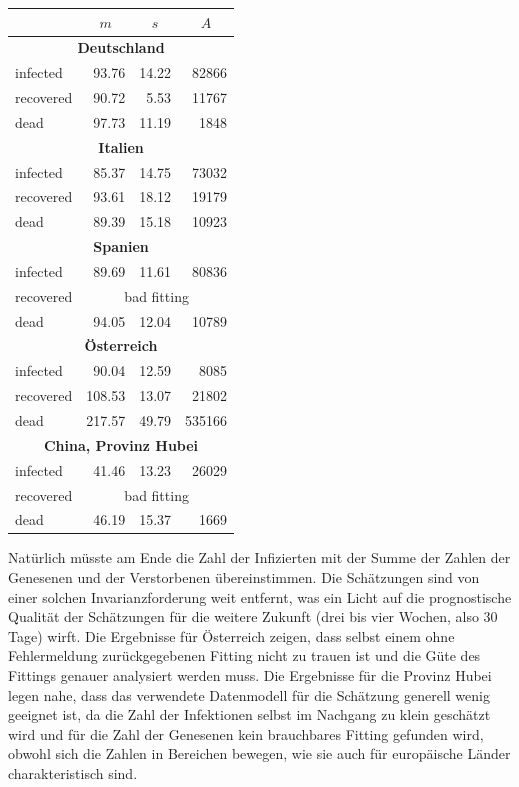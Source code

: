 \documentclass[a4paper,11pt]{article}
\begin{document}
\begin{center}
  \begin{tabular}{|l|r|r|r|}\hline
    & \multicolumn{1}{|c|}{$m$} & \multicolumn{1}{|c|}{$s$}
    & \multicolumn{1}{|c|}{$A$} \\\hline
    \multicolumn{4}{|c|}{\bf Deutschland}\\\hline
    infected   & 93.76 & 14.22 &  82866\\
    recovered  & 90.72 &  5.53 &  11767\\
    dead       & 97.73 & 11.19 &   1848\\\hline
    \multicolumn{4}{|c|}{\bf Italien}\\\hline
    infected   & 85.37 & 14.75 &  73032\\
    recovered  & 93.61 & 18.12 &  19179\\
    dead       & 89.39 & 15.18 &  10923\\\hline
    \multicolumn{4}{|c|}{\bf Spanien}\\\hline
    infected   & 89.69 & 11.61 &  80836\\
    recovered  & \multicolumn{3}{|c|}{bad fitting}\\
    dead       & 94.05 & 12.04 &  10789\\\hline
    \multicolumn{4}{|c|}{\bf Österreich}\\\hline
    infected   & 90.04 & 12.59 &   8085\\
    recovered  & 108.53& 13.07 &  21802\\
    dead       & 217.57& 49.79 & 535166\\\hline
    \multicolumn{4}{|c|}{\bf China, Provinz Hubei}\\\hline
    infected   & 41.46 & 13.23 &  26029\\
    recovered  & \multicolumn{3}{|c|}{bad fitting}\\
    dead       & 46.19 & 15.37 &   1669\\\hline
  \end{tabular}
\end{center}
Natürlich müsste am Ende die Zahl der Infizierten mit der Summe der Zahlen der
Genesenen und der Verstorbenen übereinstimmen.  Die Schätzungen sind von einer
solchen Invarianzforderung weit entfernt, was ein Licht auf die prognostische
Qualität der Schätzungen für die weitere Zukunft (drei bis vier Wochen, also
30 Tage) wirft.  Die Ergebnisse für Österreich zeigen, dass selbst einem ohne
Fehlermeldung zurückgegebenen Fitting nicht zu trauen ist und die Güte des
Fittings genauer analysiert werden muss.  Die Ergebnisse für die Provinz Hubei
legen nahe, dass das verwendete Datenmodell für die Schätzung generell wenig
geeignet ist, da die Zahl der Infektionen selbst im Nachgang zu klein
geschätzt wird und für die Zahl der Genesenen kein brauchbares Fitting
gefunden wird, obwohl sich die Zahlen in Bereichen bewegen, wie sie auch für
europäische Länder charakteristisch sind.
\end{document}
